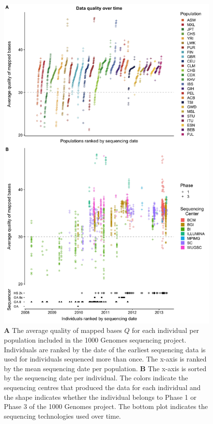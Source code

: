 \documentclass[
11pt, %
oneside, %
english, %
doublespacing, %
headsepline, %
chapterinoneline, %
]{MastersDoctoralThesis} %
\begin{document}
\begin{figure}
\includegraphics[width=0.85\hsize,keepaspectratio]{./Figures/MapQualOverTime.jpg}

\caption{\textbf{A} The average quality of mapped bases $Q$ for each individual per population included in the 1000 Genomes sequencing project. Individuals are ranked by the date of the earliest sequencing data is used for individuals sequenced more than once. The x-axis is ranked by the mean sequencing date per population. \textbf{B} The x-axis is sorted by the sequencing date per individual. The colors indicate the sequencing centres that produced the data for each individual and the shape indicates whether the individual belongs to Phase 1 or Phase 3 of the 1000 Genomes project. The bottom plot indicates the sequencing technologies used over time.}
\label{MapQual}
\end{figure}
\end{document}
